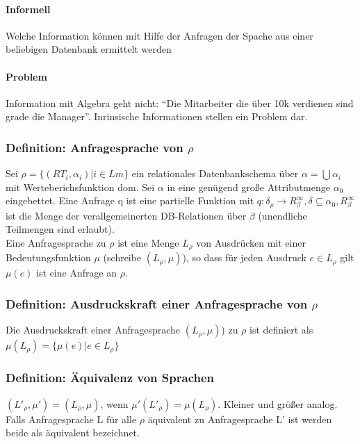 \documentclass[12pt, a4paper]{article}
\begin{document}
\paragraph{Informell}
Welche Information können mit Hilfe der Anfragen der Spache aus einer beliebigen Datenbank ermittelt werden

\paragraph{Problem}
Information mit Algebra geht nicht: ``Die Mitarbeiter die über 10k verdienen sind grade die Manager''. Inrinsische Informationen stellen ein Problem dar.

\subsubsection*{Definition: Anfragesprache von $\rho$}
Sei $\rho = \{ (RT_i, \alpha_i) | i \in Lm \}$ ein relationales Datenbankschema über $\alpha = \bigcup \alpha_i$ mit Werteberichsfunktion dom. Sei $\alpha$ in eine genügend große Attributmenge $\alpha_0$ eingebettet. Eine Anfrage q ist eine partielle Funktion mit $q: \delta_\rho \rightarrow R^{\infty}_\beta,  \delta \subseteq \alpha_0, R^{\infty}_\beta$ ist die Menge der verallgemeinerten DB-Relationen über $\beta$ (unendliche Teilmengen sind erlaubt). \\
Eine Anfragesprache zu $\rho$ ist eine Menge $L_\rho$ von Ausdrücken mit einer Bedeutungsfunktion $\mu$ (schreibe $(L_\rho, \mu)$), so dass für jeden Ausdruck $e \in L_\rho$ gilt $\mu(e)$ ist eine Anfrage an $\rho$.

\subsubsection*{Definition: Ausdruckskraft einer Anfragesprache von $\rho$}
Die Ausdruckskraft einer Anfragesprache $(L_\rho, \mu)$) zu $\rho$ ist definiert als $\mu(L_\rho) = \{ \mu(e) | e \in L_\rho \}$

\subsubsection*{Definition: Äquivalenz von Sprachen}
$(L'_\rho, \mu') = (L_\rho, \mu)$, wenn $\mu'(L'_\rho) = \mu(L_\rho)$. Kleiner und größer analog.
Falls Anfragesprache L für alle $\rho$ äquivalent zu Anfragesprache L' ist werden beide als äquivalent bezeichnet.
\end{document}
